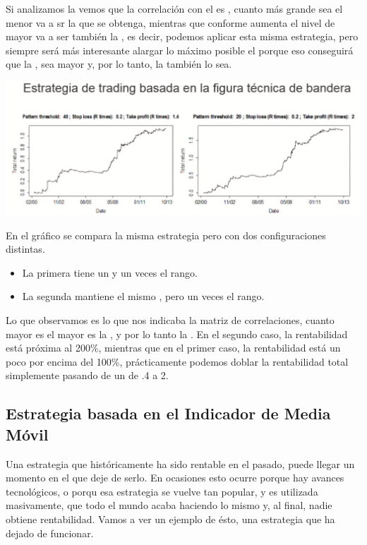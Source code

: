 Si analizamos la  vemos que la correlación con el  es , cuanto más grande sea el  menor va a sr la  que se obtenga, mientras que conforme aumenta el nivel de  mayor va a ser también la , es decir, podemos aplicar esta misma estrategia, pero siempre será más interesante alargar lo máximo posible el  porque eso conseguirá que la , sea mayor y, por lo tanto, la  también lo sea.
\begin{center}
    \includegraphics[scale=.65]{images/mod03-19.png}
\end{center}
En el gráfico se compara la misma estrategia pero con dos configuraciones distintas.
\begin{itemize}
    \item La primera tiene un  y un  veces el rango.
    \item La segunda mantiene el mismo , pero un  veces el rango.
\end{itemize}
Lo que observamos es lo que nos indicaba la matriz de correlaciones, cuanto mayor es el  mayor es la , y por lo tanto la . En el segundo caso, la rentabilidad está próxima al 200\%, mientras que en el primer caso, la rentabilidad está un poco por encima del 100\%, prácticamente podemos doblar la rentabilidad total simplemente pasando de un  de .4 a 2.

\subsection{Estrategia basada en el Indicador de Media Móvil}

Una estrategia que históricamente ha sido rentable en el pasado, puede llegar un momento en el que deje de serlo. En ocasiones esto ocurre porque hay avances tecnológicos, o porqu esa estrategia se vuelve tan popular, y es utilizada masivamente, que todo el mundo acaba haciendo lo mismo y, al final, nadie obtiene rentabilidad. Vamos a ver un ejemplo de ésto, una estrategia que ha dejado de funcionar.

